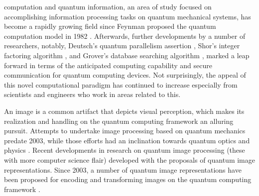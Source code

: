 \documentclass[10pt,journal,compsoc]{IEEEtran}
\begin{document}

%
%
%
%
 computation and quantum information, an area of study focused on accomplishing information processing tasks on quantum mechanical systems, has become a rapidly growing field since Feynman proposed the quantum computation model in 1982 \cite{1}. Afterwards, further developments by a number of researchers, notably, Deutsch's quantum parallelism assertion \cite{2}, Shor's integer factoring algorithm \cite{3}, and Grover's database searching algorithm \cite{4}, marked a leap forward in terms of the anticipated computing capability and secure communication for quantum computing devices. Not surprisingly, the appeal of this novel computational paradigm has continued to increase especially from scientists and engineers who work in areas related to this.

An image is a common artifact that depicts visual perception, which makes its realization and handling on the quantum computing framework an alluring pursuit. Attempts to undertake image processing based on quantum mechanics predate 2003, while those efforts had an inclination towards quantum optics and physics \cite{5,6}. Recent developments in research on quantum image processing (these with more computer science flair) developed with the proposals of quantum image representations. Since 2003, a number of quantum image representations have been proposed for encoding and transforming images on the quantum computing framework \cite{7}.
\end{document}
